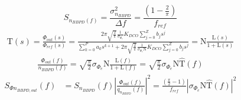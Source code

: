 \begin{equation}\label{eq:bbpd_noise_psd}
	S_{ n_{BBPD}(f)} = \frac{\sigma_{n_{BBPD}}^2}{\Delta f} = \frac{\left(1-\frac{2}{\pi}\right)}{f_{ref}}
\end{equation}
	\begin{align}\label{eq:cl_bbpd_pll}
		\mathrm{T}(s)=\frac{\Phi_{out}(s)}{\Phi_{ref}(s)} = \frac{2\pi \sqrt{\frac{2}{\pi}}\frac{1}{\sigma_{\Phi_e}}K_{DCO}\sum_{j=0}^Z b_js^j}{\sum_{k=0}^P a_ks^{k+1} + 2\pi \sqrt{\frac{2}{\pi}}\frac{\mathrm{1}}{\sigma_{\Phi_e}\mathrm{N}}K_{DCO}\sum_{j=0}^Z b_js^j} = \mathrm{N}\frac{\mathrm{L}(s)}{1+\mathrm{L}(s)}
	\end{align}
\begin{align}\label{eq:ntf_bbpd_pll}
	\frac{\Phi_{out}(f)}{n_{{BBPD}}(f)} = \sqrt{\frac{\pi}{2}}\sigma_{\Phi_e}\mathrm{N}\frac{\mathrm{L}(f)}{1+\mathrm{L}(f)} = \sqrt{\frac{\pi}{2}}\sigma_{\Phi_e}\mathrm{N}\hat{\mathrm{T}}(f)
\end{align}
\begin{align}\label{eq:out_psd_bbpd_pll}
	S_{\Phi n_{BBPD,out}}(f) &= S_{n_{BBPD}}(f)\left|\frac{\Phi_{out}(f)}{q_{n_{BBPD}}(f)}\right|^2 = \frac{\left(\frac{\pi}{2}-1\right)}{f_{ref}}\left|\sigma_{\Phi_e}\mathrm{N}\hat{\mathrm{T}}(f)\right|^2
\end{align}


